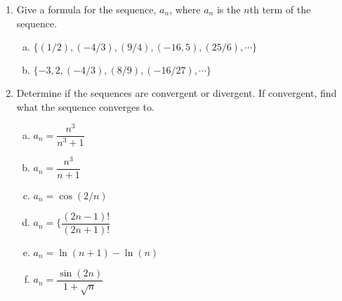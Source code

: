 \documentclass[10pt]{article}
\theoremstyle{Theorem}
\theoremstyle{definition}
\theoremstyle{remark}
\theoremstyle{custom}
\begin{document}
\begin{enumerate}[1.]
\item Give a formula for the sequence, $a_n$, where $a_n$ is the $n$th term of the sequence.
\begin{enumerate}[a.]
\item $\{(1/2), (-4/3), (9/4), (-16,5), (25/6),\cdots \}$
\item $\{-3, 2, (-4/3), (8/9), (-16/27), \cdots \}$
\end{enumerate}
\item Determine if the sequences are convergent or divergent. If convergent, find what the sequence converges to.
\begin{enumerate}[a.]
\item $a_n=\dfrac{n^3}{n^3+1}$
\item $a_n=\dfrac{n^3}{n+1}$
\item $a_n=\cos(2/n)$
\item $a_n=\lbrace \dfrac{(2n-1)!}{(2n+1)!}$
\item $a_n=\ln(n+1)-\ln(n)$
\item $a_n=\dfrac{\sin(2n)}{1+\sqrt{n}}$
\end{enumerate}
\end{enumerate}
\end{document}
